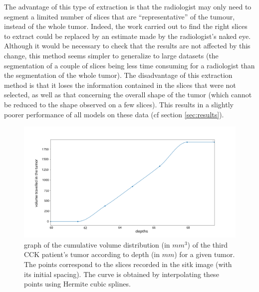 \documentclass[preprint,12pt]{elsarticle}
\begin{document}
\indent The advantage of this type of extraction is that the radiologist may only need to segment a limited number of slices that are “representative” of the tumour, instead of the whole tumor. Indeed, the work carried out to find the right slices to extract could be replaced by an estimate made by the radiologist's naked eye. Although it would be necessary to check that the results are not affected by this change, this method seems simpler to generalize to large datasets (the segmentation of a couple of slices being less time consuming for a radiologist than the segmentation of the whole tumor). The disadvantage of this extraction method is that it loses the information contained in the slices that were not selected, as well as that concerning the overall shape of the tumor (which cannot be reduced to the shape observed on a few slices). This results in a slightly poorer performance of all models on these data (cf section \ref{sec:results}).

\begin{figure}[tbp]
    \centering
    \includegraphics[scale = 0.25]{./images/plot_depth_volume_2.png}
    \caption{graph of the cumulative volume distribution (in $mm^3$) of the third CCK patient's tumor according to depth (in $mm$) for a given tumor. The points correspond to the slices recorded in the sitk image (with its initial spacing). The curve is obtained by interpolating these points using Hermite cubic splines.}
    \label{fig:depth_volume}
\end{figure}
\end{document}
